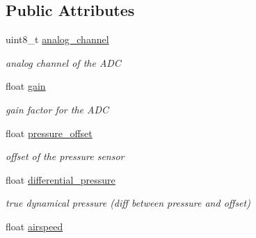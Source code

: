 \subsection*{Public Attributes}
\begin{DoxyCompactItemize}
\item 
\hypertarget{structairspeed__analog__t_ab429f0109be8a3e981536e71b999b163}{uint8\+\_\+t \hyperlink{structairspeed__analog__t_ab429f0109be8a3e981536e71b999b163}{analog\+\_\+channel}}\label{structairspeed__analog__t_ab429f0109be8a3e981536e71b999b163}

\begin{DoxyCompactList}\small\item\em analog channel of the A\+D\+C \end{DoxyCompactList}\item 
\hypertarget{structairspeed__analog__t_a403bdc46358ebc73806c00e645a52a2a}{float \hyperlink{structairspeed__analog__t_a403bdc46358ebc73806c00e645a52a2a}{gain}}\label{structairspeed__analog__t_a403bdc46358ebc73806c00e645a52a2a}

\begin{DoxyCompactList}\small\item\em gain factor for the A\+D\+C \end{DoxyCompactList}\item 
\hypertarget{structairspeed__analog__t_add16f84699bfaaccbff46c73a3125fd4}{float \hyperlink{structairspeed__analog__t_add16f84699bfaaccbff46c73a3125fd4}{pressure\+\_\+offset}}\label{structairspeed__analog__t_add16f84699bfaaccbff46c73a3125fd4}

\begin{DoxyCompactList}\small\item\em offset of the pressure sensor \end{DoxyCompactList}\item 
\hypertarget{structairspeed__analog__t_a7babb5164e6a9f270818732393921b89}{float \hyperlink{structairspeed__analog__t_a7babb5164e6a9f270818732393921b89}{differential\+\_\+pressure}}\label{structairspeed__analog__t_a7babb5164e6a9f270818732393921b89}

\begin{DoxyCompactList}\small\item\em true dynamical pressure (diff between pressure and offset) \end{DoxyCompactList}\item 
\hypertarget{structairspeed__analog__t_a7e9796a78f9e004a7947c5917780c005}{float \hyperlink{structairspeed__analog__t_a7e9796a78f9e004a7947c5917780c005}{airspeed}}\label{structairspeed__analog__t_a7e9796a78f9e004a7947c5917780c005}


\end{DoxyCompactItemize}
